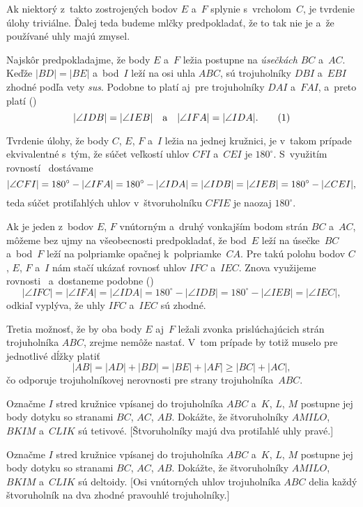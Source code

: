 {%
Ak niektorý z~takto zostrojených bodov $E$ a~$F$ splynie s~vrcholom~$C$,
je tvrdenie úlohy triviálne. Ďalej teda budeme mlčky predpokladať, že to tak nie je
a~že používané uhly majú zmysel.
%

Najskôr predpokladajme, že body $E$ a~$F$ ležia postupne na
{\it úsečkách} $BC$ a~$AC$. Keďže $|BD|=|BE|$ a~bod~$I$ leží
na osi uhla $ABC$, sú trojuholníky $DBI$ a~$EBI$ zhodné podľa vety
{\it sus}. Podobne to platí aj~pre trojuholníky $DAI$ a~$FAI$, a~preto
platí (\obr)
$$
|\angle IDB|=|\angle IEB|\quad \text{a} \quad |\angle IFA|=|\angle IDA|. \tag1
$$

Tvrdenie úlohy, že body $C$, $E$, $F$ a~$I$ ležia na jednej
kružnici, je v~takom prípade ekvivalentné s~tým, že súčet
veľkostí uhlov $CFI$ a~$CEI$ je $180^\circ$. S~využitím rovností~
dostávame
$$
\postdisplaypenalty 10000
|\angle CFI|=180^\circ-|\angle IFA|=180^\circ-|\angle IDA|
=|\angle IDB|=|\angle IEB|=180^\circ-|\angle CEI|,
$$
teda súčet protiľahlých uhlov v~štvoruholníku $CFIE$ je naozaj $180^\circ$.


Ak je jeden z~bodov $E$, $F$ vnútorným a~druhý
vonkajším bodom strán $BC$ a~$AC$, môžeme bez ujmy na všeobecnosti predpokladať,
že bod~$E$ leží na úsečke~$BC$ a~bod~$F$ leží na polpriamke opačnej
k~polpriamke~$CA$. Pre takú polohu bodov $C$, $E$, $F$ a~$I$ nám stačí ukázať
rovnosť uhlov $IFC$ a~$IEC$. Znova využijeme
rovnosti~ a~dostaneme podobne (\obr)
$$
|\angle IFC|=|\angle IFA|=|\angle IDA|=180^\circ-|\angle IDB|
=180^\circ-|\angle IEB|=|\angle IEC|,
$$
odkiaľ vyplýva, že uhly $IFC$ a~$IEC$ sú zhodné.
%

Tretia možnosť, že by oba body $E$ aj~$F$ ležali
zvonka prislúchajúcich strán trojuholníka $ABC$, zrejme nemôže nastať. V~tom
prípade by totiž muselo pre jednotlivé dĺžky platiť
$$
|AB|=|AD|+|BD|=|BE|+|AF|\ge |BC|+|AC|,
$$
čo odporuje trojuholníkovej nerovnosti pre strany trojuholníka~$ABC$.


Označme $I$ stred kružnice vpísanej do trojuholníka $ABC$ a~$K$, $L$, $M$ postupne
jej body dotyku so stranami $BC$, $AC$, $AB$. Dokážte,
že štvoruholníky $AMILO$, $BKIM$ a~$CLIK$ sú tetivové. [Štvoruholníky
majú dva protiľahlé uhly pravé.]

Označme $I$ stred kružnice vpísanej do trojuholníka $ABC$ a~$K$, $L$, $M$ postupne
jej body dotyku so stranami $BC$, $AC$, $AB$. Dokážte,
že štvoruholníky $AMILO$, $BKIM$ a~$CLIK$ sú deltoidy. [Osi vnútorných
uhlov trojuholníka $ABC$ delia každý štvoruholník na dva zhodné
pravouhlé trojuholníky.]

}
